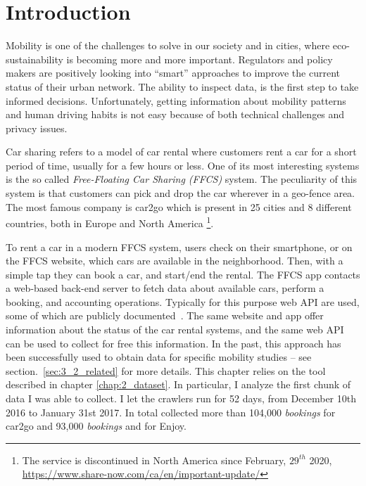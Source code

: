 \section{Introduction}
\label{sec:3_1_intro}

Mobility is one of the challenges to solve in our society and in cities, where eco-sustainability is becoming more and more important. 
Regulators and policy makers are positively looking into ``smart'' approaches to improve the current status of their urban network.  The ability to inspect data, is the first step to take informed decisions. Unfortunately, getting information about mobility patterns and human driving habits is not easy because of both technical challenges and privacy issues.

Car sharing refers to a model of car rental where customers rent a car for a short period of time, usually for a few hours or less. One of its most interesting systems is the so called \textit{Free-Floating Car Sharing (FFCS)} system. The peculiarity of this system is that customers can pick and drop the car wherever in a geo-fence area.
The most famous company is car2go which is present in 25 cities and 8 different countries, both in Europe and North America \footnote{The service is discontinued in North America since February, $29^{th}$ 2020, \url{https://www.share-now.com/ca/en/important-update/}}.

To rent a car in a modern FFCS system, users check on their smartphone, or on the FFCS website, which cars are available in the neighborhood. Then, with a simple tap they can book a car, and start/end the rental. The FFCS app contacts a web-based back-end server to fetch data about available cars, perform a booking, and accounting operations. Typically for this purpose web API are used, some of which are publicly documented~\cite{car2goAPI}. The same website and app offer information about the status of the car rental systems, and the same web API can be used to collect for free this information. In the past, this approach has been successfully used to obtain data for specific mobility studies -- see section.~\ref{sec:3_2_related} for more details. 
This chapter relies on the tool described in chapter \ref{chap:2_dataset}. In particular, I analyze the first chunk of data I was able to collect. I let the crawlers run for 52 days,  from December 10th 2016 to January 31st 2017. In total \tool collected more than 104,000 \textit{bookings} for car2go and 93,000 \textit{bookings} and for Enjoy. 


